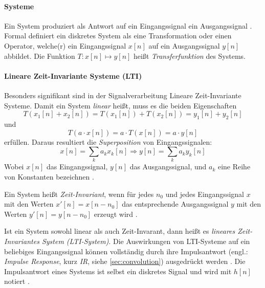 \paragraph{Systeme}
Ein System produziert als Antwort auf ein Eingangssignal ein Ausgangssignal \cite[Kap. 5]{smith1997}.
Formal definiert \cite[Seite 16]{oppenheim1999} ein diskretes System als eine Transformation oder einen Operator, welche(r) ein Eingangssignal $x[n]$
auf ein Ausgangssignal $y[n]$ abbildet. Die Funktion $T:x[n]\mapsto y[n]$ heißt \textit{Transferfunktion} des Systems.
\paragraph{Lineare Zeit-Invariante Systeme (LTI)}
Besonders signifikant sind in der Signalverarbeitung Lineare Zeit-Invariante Systeme. Damit ein System \textit{linear}
heißt, muss es die beiden Eigenschaften
\begin{equation}
    T(x_1[n]+x_2[n])=T(x_1[n])+T(x_2[n])=y_1[n]+y_2[n]
\end{equation}
und 
\begin{equation}
    T(a\cdot x[n])=a\cdot T(x[n])=a\cdot y[n]
\end{equation}
erfüllen.
Daraus resultiert die \textit{Superposition} von Eingangssignalen:
\begin{equation}
    x[n]=\sum_{k}a_kx_k[n]\Rightarrow y[n]=\sum_{k}a_ky_k[n]
\end{equation}
Wobei $x[n]$ das Eingangssignal, $y[n]$ das Ausgangssignal, und $a_k$ eine Reihe von Konstanten bezeichnen \cite{oppenheim1999}.

Ein System heißt \textit{Zeit-Invariant}, wenn für jedes $n_0$ und jedes Eingangssignal $x$ mit den Werten
$x'[n]=x[n-n_0]$ das entsprechende Ausgangssignal $y$ mit den Werten $y'[n]=y[n-n_0]$ erzeugt wird \cite{oppenheim1999}.

Ist ein System sowohl linear als auch Zeit-Invarant, dann heißt es \textit{lineares Zeit-Invariantes System (LTI-System)}.
Die Auswirkungen von LTI-Systeme auf ein beliebiges Eingangssignal können vollständig durch ihre Impulsantwort (engl.: \textit{Impulse Response}, kurz \textit{IR},
siehe \ref{sec:convolution}) ausgedrückt werden \cite{oppenheim1999}.
Die Impulsantwort eines Systems ist selbst ein diskretes Signal und wird mit $h[n]$ notiert \cite[Kapitel 2, Seite 23]{oppenheim1999}.
